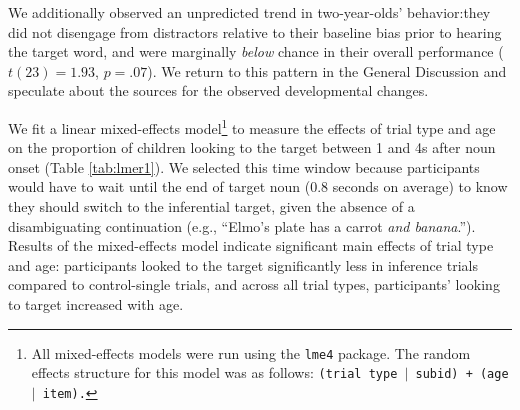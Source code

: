 \documentclass[10pt,letterpaper]{article}
\begin{document}
We additionally observed an unpredicted trend in two-year-olds' behavior:they did not disengage from distractors relative to their baseline bias prior to hearing the target word, and were marginally \emph{below} chance in their overall performance ($t(23)  = 1.93$, $p = .07$). We return to this pattern in the General Discussion and speculate about the sources for the observed developmental changes.

We fit a linear mixed-effects model\footnote{All mixed-effects models were run using the \texttt{lme4} package. The random effects structure for this model was as follows: \texttt{(trial type $|$ subid) + (age $|$ item).}} to measure the effects of trial type and age on the proportion of children looking to the target between 1 and 4s after noun onset (Table \ref{tab:lmer1}). We selected this time window because participants would have to wait until the end of target noun (0.8 seconds on average) to know they should switch to the inferential target, given the absence of a disambiguating continuation (e.g., ``Elmo's plate has a carrot \emph{and banana}.''). Results of the mixed-effects model indicate significant main effects of trial type and age: participants looked to the target significantly less in inference trials compared to control-single trials, and across all trial types, participants' looking to target increased with age. 



\end{document}
